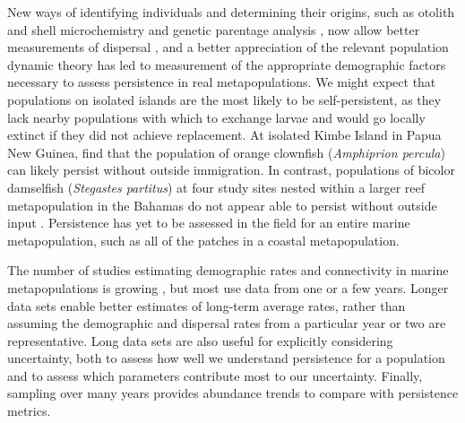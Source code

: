 \documentclass[12pt, oneside]{article}   	%
\begin{document}
New ways of identifying individuals and determining their origins, such as otolith and shell microchemistry and genetic parentage analysis \citep[e.g.,][]{wang2004sibship, wang2014estimation}, now allow better measurements of dispersal \citep[e.g.,][]{almany2017larval, daloia_self-recruitment_2013}, and a better appreciation of the relevant population dynamic theory has led to measurement of the appropriate demographic factors \citep[e.g.,][]{carson2011evaluating, hameed2016inverse} necessary to assess persistence in real metapopulations. We might expect that populations on isolated islands are the most likely to be self-persistent, as they lack nearby populations with which to exchange larvae and would go locally extinct if they did not achieve replacement. At isolated Kimbe Island in Papua New Guinea, \cite{salles_coral_2015} find that the population of orange clownfish (\textit{Amphiprion percula}) can likely persist without outside immigration. In contrast, populations of bicolor damselfish (\textit{Stegastes partitus}) at four study sites nested within a larger reef metapopulation in the Bahamas do not appear able to persist without outside input \citep{johnson2018integrating}. Persistence has yet to be assessed in the field for an entire marine metapopulation, such as all of the patches in a coastal metapopulation. 

The number of studies estimating demographic rates and connectivity in marine metapopulations is growing \citep[e.g.][]{carson2011evaluating, salles_coral_2015, johnson2018integrating, garavelli2018population}, but most use data from one or a few years. Longer data sets enable better estimates of long-term average rates, rather than assuming the demographic and dispersal rates from a particular year or two are representative. Long data sets are also useful for explicitly considering uncertainty, both to assess how well we understand persistence for a population and to assess which parameters contribute most to our uncertainty. Finally, sampling over many years provides abundance trends to compare with persistence metrics.

\end{document}
